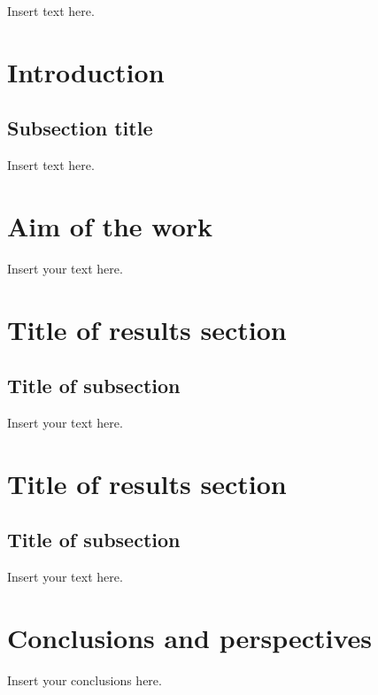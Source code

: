 Insert text here.

\section{Introduction}
\subsection{Subsection title}

Insert text here.

\section{Aim of the work}

Insert your text here.

\section{Title of results section}
\subsection{Title of subsection}

Insert your text here.

\section{Title of results section}
\subsection{Title of subsection}

Insert your text here.


\clearpage
\section{Conclusions and perspectives}

Insert your conclusions here. 

\printbibliography[heading=bibliography, title={References}]


